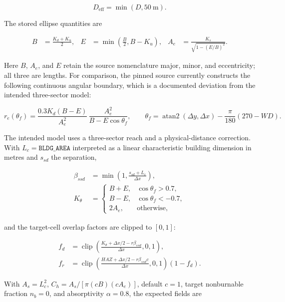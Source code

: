 \begin{equation}
  D_{\mathrm{eff}}=\min(D,\SI{50}{\metre}).
\end{equation}

The stored ellipse quantities are

\begin{align}
 B &= \frac{K_d+K_u}{2}, &
 E &= \min\left(\frac{B}{2},B-K_u\right), &
 A_e &= \frac{K_s}{\sqrt{1-(E/B)^2}}.
\end{align}

Here $B$, $A_e$, and $E$ retain the source nomenclature major,
minor, and eccentricity; all three are lengths.  For comparison, the pinned
source currently constructs the following continuous angular boundary, which
is a documented deviation from the intended three-sector model:

\begin{equation}
 r_e(\theta_f)=
 \frac{0.3K_d(B-E)}{A_e^2}\,
 \frac{A_e^2}{B-E\cos\theta_f},
 \qquad \theta_f=\operatorname{atan2}(\Delta y,\Delta x)
                  -\frac{\pi}{180}(270-WD).
\end{equation}

The intended model uses a three-sector reach and a physical-distance
correction.  With $L_c=\texttt{BLDG\_AREA}$ interpreted as a linear
characteristic building dimension in metres and $s_{sd}$ the separation,

\begin{align}
 \beta_{ssd}&=\min\!\left(1,\frac{s_{sd}+L_c}{\Delta x}\right),\\
 K_\theta&=\begin{cases}B+E,&\cos\theta_f>0.7,\\B-E,&\cos\theta_f<-0.7,\\2A_e,&\text{otherwise},\end{cases}
\end{align}

and the target-cell overlap factors are clipped to $[0,1]$:

\begin{align}
 f_d &= \operatorname{clip}\!\left(
       \frac{K_\theta+\Delta x/2-r\beta_{ssd}}{\Delta x},0,1\right),\\
 f_r &= \operatorname{clip}\!\left(
       \frac{HAZ+\Delta x/2-r\beta_{ssd}c}{\Delta x},0,1\right)(1-f_d).
\end{align}

With $A_s=L_c^2$, $C_h=A_s/[\pi(cB)(cA_e)]$, default $c=1$, target
nonburnable fraction $n_b=0$, and absorptivity $\alpha=0.8$, the expected
fields are

